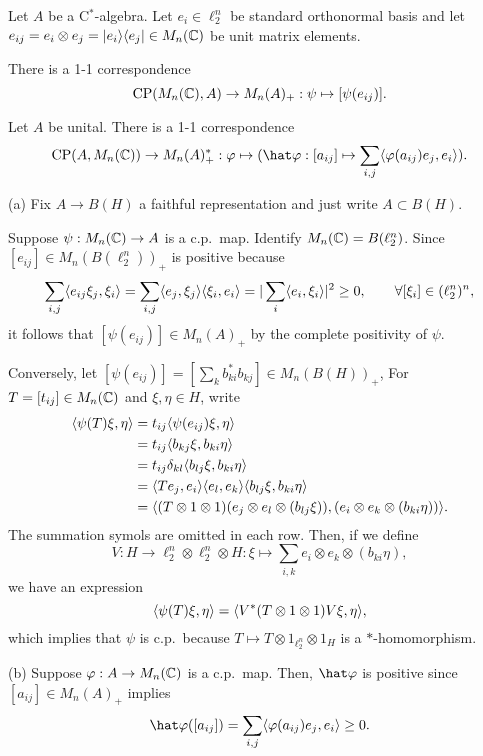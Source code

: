 \documentclass{../../../small}
\begin{document}
\begin{thm}
Let $A$ be a C$^*$-algebra.
Let $e_i\in\ell_2^n$ be standard orthonormal basis and let $e_{ij}=e_i\otimes e_j=|e_i\rangle\langle e_j|\in M_n(\mathbb{C})$ be unit matrix elements.
\begin{parts}
\item
There is a 1-1 correspondence
\[\mathrm{CP}(M_n(\mathbb{C}), A)\to M_n(A)_+:\psi\mapsto[\psi(e_{ij})].\]
\item
Let $A$ be unital.
There is a 1-1 correspondence
\[\mathrm{CP}(A,M_n(\C))\to M_n(A)^*_+:\f\mapsto(\hat\f:[a_{ij}]\mapsto\sum_{i,j}\<\f(a_{ij})e_j,e_i\>).\]
\end{parts}
\end{thm}
\begin{pf}
(a)
Fix $A\to B(H)$ a faithful representation and just write $A\subset B(H)$.

Suppose $\psi:M_n(\mathbb{C})\to A$ is a c.p.~map.
Identify $M_n(\mathbb{C})=B(\ell_2^n)$.
Since $[e_{ij}]\in M_n(B(\ell_2^n))_+$ is positive because
\[\sum_{i,j}\langle e_{ij}\xi_j,\xi_i\rangle=\sum_{i,j}\langle e_j,\xi_j\rangle\langle\xi_i,e_i\rangle=|\sum_i\langle e_i,\xi_i\rangle|^2\ge0,\qquad\forall[\xi_i]\in(\ell_2^n)^n,\]
it follows that $[\psi(e_{ij})]\in M_n(A)_+$ by the complete positivity of $\psi$.

Conversely, let $[\psi(e_{ij})]=[\sum_kb_{ki}^*b_{kj}]\in M_n(B(H))_+$,
For $T=[t_{ij}]\in M_n(\mathbb{C})$ and $\xi,\eta\in H$, write
\begin{align*}
\langle\psi(T)\xi,\eta\rangle
&=t_{ij}\langle\psi(e_{ij})\xi,\eta\rangle\\
&=t_{ij}\langle b_{kj}\xi,b_{ki}\eta\rangle\\
&=t_{ij}\delta_{kl}\langle b_{lj}\xi,b_{ki}\eta\rangle\\
&=\langle Te_j,e_i\rangle\langle e_l,e_k\rangle\langle b_{lj}\xi,b_{ki}\eta\rangle\\
&=\langle(T\otimes1\otimes1)(e_j\otimes e_l\otimes(b_{lj}\xi)),(e_i\otimes e_k\otimes(b_{ki}\eta))\rangle.
\end{align*}
The summation symols are omitted in each row.
Then, if we define
\[V:H\to\ell_2^n\otimes\ell_2^n\otimes H:\xi\mapsto\sum_{i,k}e_i\otimes e_k\otimes(b_{ki}\eta),\]
we have an expression
\[\langle\psi(T)\xi,\eta\rangle=\langle V^*(T\otimes1\otimes1)V\xi,\eta\rangle,\]
which implies that $\psi$ is c.p.~because $T\mapsto T\otimes1_{\ell_2^n}\otimes1_H$ is a $*$-homomorphism.

(b)
Suppose $\varphi:A\to M_n(\mathbb{C})$ is a c.p.~map.
Then, $\hat\f$ is positive since $[a_{ij}]\in M_n(A)_+$ implies
\[\hat\f([a_{ij}])=\sum_{i,j}\<\f(a_{ij})e_j,e_i\>\ge0.\]


\end{pf}
\end{document}
